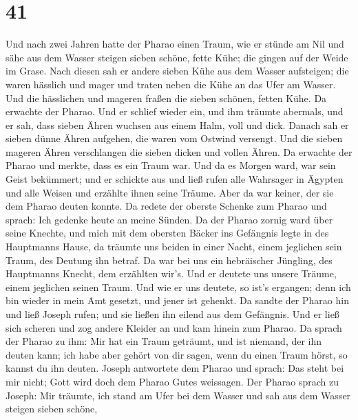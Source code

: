 \hypertarget{section-40}{%
\section{41}\label{section-40}}

 Und nach zwei Jahren hatte der Pharao einen Traum, wie er
stünde am Nil  und sähe aus dem Wasser steigen sieben
schöne, fette Kühe; die gingen auf der Weide im Grase. 
Nach diesen sah er andere sieben Kühe aus dem Wasser aufsteigen; die
waren hässlich und mager und traten neben die Kühe an das Ufer am
Wasser.  Und die hässlichen und mageren fraßen die sieben
schönen, fetten Kühe. Da erwachte der Pharao.  Und er
schlief wieder ein, und ihm träumte abermals, und er sah, dass sieben
Ähren wuchsen aus einem Halm, voll und dick.  Danach sah
er sieben dünne Ähren aufgehen, die waren vom Ostwind versengt.
 Und die sieben mageren Ähren verschlangen die sieben
dicken und vollen Ähren. Da erwachte der Pharao und merkte, dass es ein
Traum war.  Und da es Morgen ward, war sein Geist
bekümmert; und er schickte aus und ließ rufen alle Wahrsager in Ägypten
und alle Weisen und erzählte ihnen seine Träume. Aber da war keiner, der
sie dem Pharao deuten konnte.  Da redete der oberste
Schenke zum Pharao und sprach: Ich gedenke heute an meine Sünden.
 Da der Pharao zornig ward über seine Knechte, und mich
mit dem obersten Bäcker ins Gefängnis legte in des Hauptmanns Hause,
 da träumte uns beiden in einer Nacht, einem jeglichen
sein Traum, des Deutung ihn betraf.  Da war bei uns ein
hebräischer Jüngling, des Hauptmanns Knecht, dem erzählten wir's. Und er
deutete uns unsere Träume, einem jeglichen seinen Traum. 
Und wie er uns deutete, so ist's ergangen; denn ich bin wieder in mein
Amt gesetzt, und jener ist gehenkt.  Da sandte der Pharao
hin und ließ Joseph rufen; und sie ließen ihn eilend aus dem Gefängnis.
Und er ließ sich scheren und zog andere Kleider an und kam hinein zum
Pharao.  Da sprach der Pharao zu ihm: Mir hat ein Traum
geträumt, und ist niemand, der ihn deuten kann; ich habe aber gehört von
dir sagen, wenn du einen Traum hörst, so kannst du ihn deuten.
 Joseph antwortete dem Pharao und sprach: Das steht bei
mir nicht; Gott wird doch dem Pharao Gutes weissagen. 
Der Pharao sprach zu Joseph: Mir träumte, ich stand am Ufer bei dem
Wasser  und sah aus dem Wasser steigen sieben schöne,

